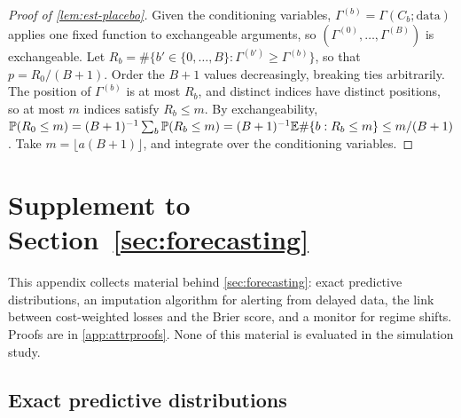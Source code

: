 \begin{proof}[Proof of \cref{lem:est-placebo}]
Given the conditioning variables, $\Gamma^{(b)}=\Gamma(C_b;\text{data})$ applies one fixed
function to exchangeable arguments, so $(\Gamma^{(0)},\dots,\Gamma^{(B)})$ is exchangeable.
Let $R_b=\#\{b'\in\{0,\dots,B\}:\Gamma^{(b')}\ge\Gamma^{(b)}\}$, so that $p=R_0/(B+1)$.
Order the $B+1$ values decreasingly, breaking ties arbitrarily. The position of
$\Gamma^{(b)}$ is at most $R_b$, and distinct indices have distinct positions, so at most
$m$ indices satisfy $R_b\le m$. By exchangeability,
$\mathbb{P}(R_0\le m)=(B+1)^{-1}\sum_b\mathbb{P}(R_b\le m)=(B+1)^{-1}\mathbb{E}\#\{b:R_b\le m\}\le m/(B+1)$. Take
$m=\lfloor a(B+1)\rfloor$, and integrate over the conditioning variables.
\end{proof}

\section{Supplement to Section~\ref{sec:forecasting}}\label{app:fc-supp}

This appendix collects material behind \cref{sec:forecasting}: exact predictive
distributions, an imputation algorithm for alerting from delayed data, the link between
cost-weighted losses and the Brier score, and a monitor for regime shifts. Proofs are in
\cref{app:attrproofs}. None of this material is evaluated in the simulation study.

\subsection{Exact predictive distributions}\label{app:fc-pgf}

